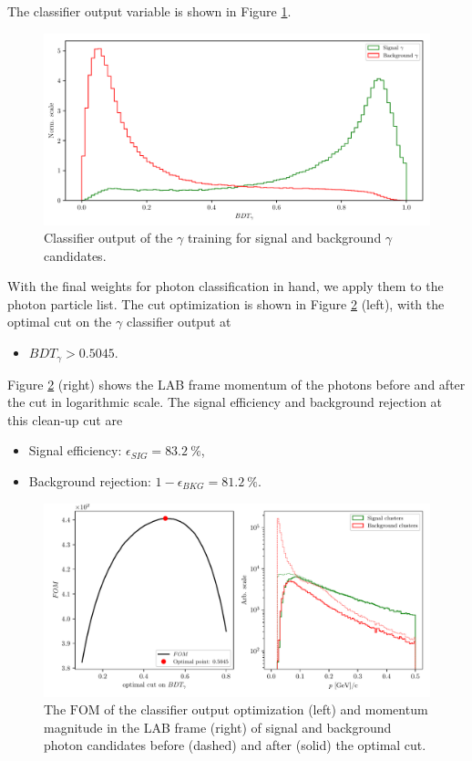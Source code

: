 The classifier output variable is shown in Figure \ref{fig:ROE_gamma}.

\begin{figure}[H]
	\centering
	\captionsetup{width=0.8\linewidth}
	\includegraphics[width=\linewidth]{fig/ROECleanup_gamma}
	\caption{Classifier output of the $\gamma$ training for signal and background $\gamma$ candidates.}
	\label{fig:ROE_gamma}
\end{figure}

With the final weights for photon classification in hand, we apply them to the photon particle list. The cut optimization is shown in Figure \ref{fig:ROE_gamma_opt} (left), with the optimal cut on the $\gamma$ classifier output at
\begin{itemize}
	\item $BDT_\gamma > 0.5045$.
\end{itemize}

Figure \ref{fig:ROE_gamma_opt} (right) shows the LAB frame momentum of the photons before and after the cut in logarithmic scale. The signal efficiency and background rejection at this clean-up cut are
\begin{itemize}
	\item Signal efficiency: $\epsilon_{SIG} = 83.2~\%$,
	\item Background rejection: $1-\epsilon_{BKG} = 81.2~\%$.
\end{itemize}

\begin{figure}[H]
	\centering
	\captionsetup{width=0.8\linewidth}
	\includegraphics[width=\linewidth]{fig/ROECleanup_gamma_opt}
	\caption{The $\mathrm{FOM}$ of the classifier output optimization (left) and  momentum magnitude in the LAB frame (right) of signal and background photon candidates before (dashed) and after (solid) the optimal cut.}
	\label{fig:ROE_gamma_opt}
\end{figure}

